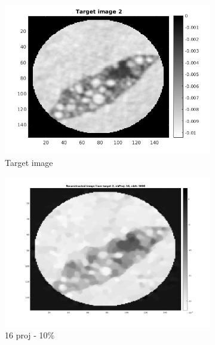 \documentclass[10pt,a4paper,titlepage]{article}
\begin{document}
\begin{figure}[H]
        	
        	\begin{subfigure}[b]{0.32\textwidth}   
        	    \centering 
            	\includegraphics[width=\textwidth]{Sample2/target2.png}
            	\caption{Target image}
        	\end{subfigure}
        	\begin{subfigure}[b]{0.32\textwidth}   
        	    \centering 
        	    \includegraphics[width=\textwidth]{Sample2/L-D_5000/16_1_10.png}
        	    \caption{16 proj - 10\%}    
        	    \label{subfig:16p2L-D}
       		\end{subfigure}
        	\begin{subfigure}[b]{0.32\textwidth}  

\end{subfigure}
\end{figure}
\end{document}
